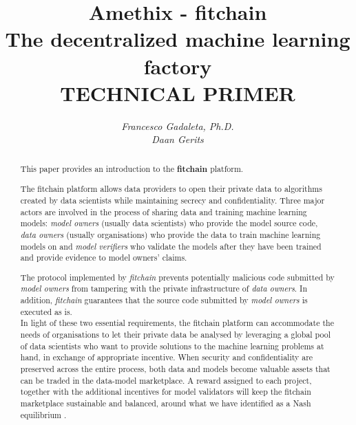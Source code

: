 \documentclass[12pt, a4paper,titlepage]{extreport}
\date{}
\begin{document}
 
\title{\textbf{Amethix - fitchain}\\ The decentralized machine learning factory\\
\small{TECHNICAL PRIMER}}

\author{\textit{Francesco Gadaleta, Ph.D.}\\ \textit{Daan Gerits}}
\maketitle


\begin{abstract}
This paper provides an introduction to the \textbf{fitchain} platform. 

The fitchain platform allows data providers to open their private data to algorithms created by data scientists while maintaining secrecy and confidentiality. Three major actors are involved in the process of sharing data and training machine learning models: \textit{model owners} (usually data scientists) who provide the model source code, \textit{data owners} (usually organisations) who provide the data to train machine learning models on and \textit{model verifiers} who validate the models after they have been trained and provide evidence to model owners' claims.
 
The protocol implemented by \textit{fitchain} prevents potentially malicious code submitted by \textit{model owners} from tampering with the private infrastructure of \textit{data owners}. In addition, \textit{fitchain} guarantees that the source code submitted by \textit{model owners} is executed as is. \\
In light of these two essential requirements, the fitchain platform can accommodate the needs of organisations to let their private data be analysed by leveraging a global pool of data scientists who want to provide solutions to the machine learning problems at hand, in exchange of appropriate incentive. When security and confidentiality are preserved across the entire process, both data and models become valuable assets that can be traded in the data-model marketplace. 
A reward assigned to each project, together with the additional incentives for model validators will keep the fitchain marketplace sustainable and balanced, around what we have identified as a Nash equilibrium \cite{nash}.
\end{abstract}
\end{document}
